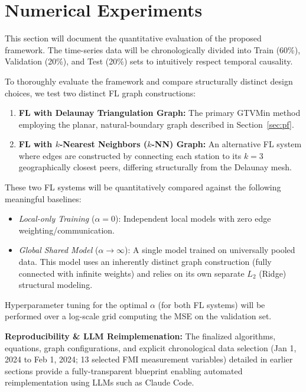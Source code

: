 \documentclass{article}
\begin{document}
\section{Numerical Experiments}
\label{sec:experiments}

This section will document the quantitative evaluation of the proposed framework. The time-series data will be chronologically divided into Train (60\%), Validation (20\%), and Test (20\%) sets to intuitively respect temporal causality.

To thoroughly evaluate the framework and compare structurally distinct design choices, we test two distinct FL graph constructions:
\begin{enumerate}
    \item \textbf{FL with Delaunay Triangulation Graph:} The primary GTVMin method employing the planar, natural-boundary graph described in Section~\ref{sec:pf}.
    \item \textbf{FL with $k$-Nearest Neighbors ($k$-NN) Graph:} An alternative FL system where edges are constructed by connecting each station to its $k=3$ geographically closest peers, differing structurally from the Delaunay mesh.
\end{enumerate}

These two FL systems will be quantitatively compared against the following meaningful baselines:
\begin{itemize}
    \item \textit{Local-only Training} ($\alpha = 0$): Independent local models with zero edge weighting/communication.
    \item \textit{Global Shared Model} ($\alpha \to \infty$): A single model trained on universally pooled data. This model uses an inherently distinct graph construction (fully connected with infinite weights) and relies on its own separate $L_2$ (Ridge) structural modeling.
\end{itemize}

Hyperparameter tuning for the optimal $\alpha$ (for both FL systems) will be performed over a log-scale grid computing the MSE on the validation set. 

\textbf{Reproducibility \& LLM Reimplemenation:} The finalized algorithms, equations, graph configurations, and explicit chronological data selection (Jan 1, 2024 to Feb 1, 2024; 13 selected FMI measurement variables) detailed in earlier sections provide a fully-transparent blueprint enabling automated reimplementation using LLMs such as Claude Code.
\end{document}
